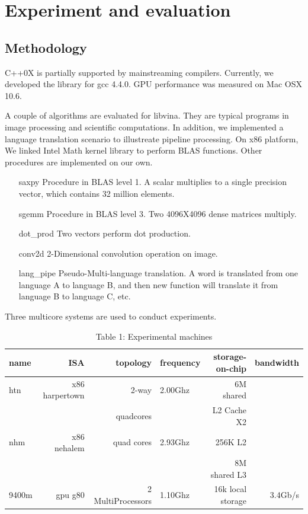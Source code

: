 \documentclass[10pt, conference, compsocconf]{IEEEtran}
\begin{document}
\section{Experiment and evaluation}
\subsection{Methodology}
C++0X is partially supported by mainstreaming compilers. Currently, we developed the library for gcc 4.4.0. GPU performance was measured on Mac OSX 10.6. 

A couple of algorithms are evaluated for libvina.  They are typical programs in image processing and scientific computations. In addition, we implemented a language translation scenario to illustreate pipeline processing. 
On x86 platform, We linked Intel Math kernel library to perform BLAS functions. Other procedures are implemented on our own. 

\begin{itemize}
\item[saxpy] Procedure in BLAS level 1. A scalar multiplies to a single precision vector, which contains 32 million elements.
\item[sgemm] Procedure in BLAS level 3. Two 4096X4096 dense matrices multiply.
\item[dot\_prod] Two vectors perform dot production.
\item[conv2d] 2-Dimensional convolution operation on image.
\item[lang\_pipe] Pseudo-Multi-language translation. A word is translated from one language A to language B, and then new function will translate it from language B to language C, etc.
\end{itemize}

Three multicore systems are used to conduct experiments. 
\begin{table}[hb]
\caption{Table 1: Experimental machines}
\begin{center}
\begin{tabular}{|l|r|r|l|r|r|}
\hline
name& ISA         & topology   & frequency  & storage-on-chip & bandwidth\\
\hline 
htn & x86 harpertown& 2-way & 2.00Ghz & 6M shared& \\
    &               &quadcores&       & L2 Cache X2&\\           
\hline
nhm & x86 nehalem & quad cores& 2.93Ghz & 256K L2&  \\
    &             &           &         & 8M shared L3&         \\                   
\hline
9400m & gpu g80  & 2 MultiProcessors& 1.10Ghz & 16k local storage& 3.4Gb/s \\
\hline
\end{tabular} 
\end{center}
\end{table}
\end{document}
